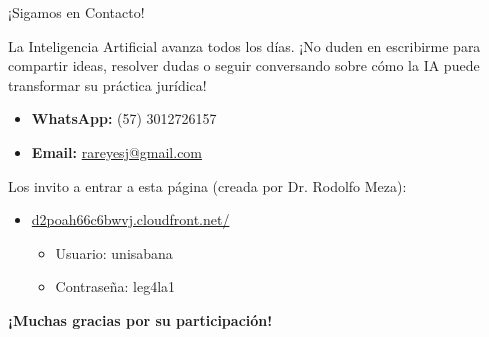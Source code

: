 \documentclass[aspectratio=169]{beamer}
\begin{document}
\begin{frame}[fragile]{¡Sigamos en Contacto!}


La Inteligencia Artificial avanza todos los días. ¡No duden en escribirme para compartir ideas, resolver dudas o seguir conversando sobre cómo la IA puede transformar su práctica jurídica!

\begin{itemize}
  \item \textbf{WhatsApp:} (57) 3012726157
  \item \textbf{Email:} \href{mailto:rareyesj@gmail.com}{rareyesj@gmail.com}
\end{itemize}
Los invito a entrar a esta página (creada por Dr. Rodolfo Meza):

\begin{itemize}
  \item \href{https://d2poah66c6bwvj.cloudfront.net/legal-prompting/anatomia-prompt}{d2poah66c6bwvj.cloudfront.net/}
  \begin{itemize}
    \item Usuario: unisabana
    \item Contraseña: leg4la1
  \end{itemize}
\end{itemize}
\textbf{ ¡Muchas gracias por su participación!}
\end{frame}
\end{document}
